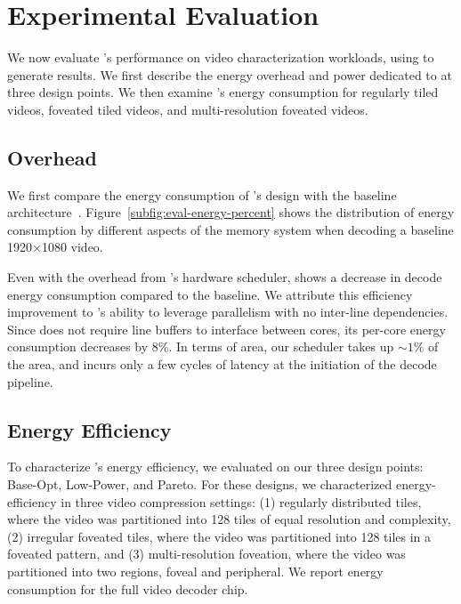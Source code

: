 
\section{Experimental Evaluation}

We now evaluate \nameArch's performance on video characterization workloads, using \nameArchprof to generate results.
We first describe the energy overhead and power dedicated to \nameArch at three design points.
We then examine \nameArch's energy consumption for regularly tiled videos, foveated tiled videos, and multi-resolution foveated videos.



\subsection{\nameArch Overhead}
We first compare the energy consumption of \nameArch's design with the baseline architecture~\cite{tikekar18ijssc}. Figure~\ref{subfig:eval-energy-percent} shows the distribution of energy consumption by different aspects of the memory system when decoding a baseline 1920$\times$1080 video.

\evalEnergyPower

Even with the overhead from \nameArch's hardware scheduler, \nameArch shows a decrease in decode energy consumption compared to the baseline. We attribute this efficiency improvement to \nameArch's ability to leverage parallelism with no inter-line dependencies.
Since \nameArch does not require line buffers to interface between cores, its per-core energy consumption decreases by 8\%.
In terms of area, our scheduler takes up $\sim1\%$ of the area, and incurs only a few cycles of latency at the initiation of the decode pipeline.

\subsection{Energy Efficiency}
To characterize \nameArch's energy efficiency, we evaluated on our three \nameArch design points: Base-Opt, Low-Power, and Pareto. For these designs, we characterized energy-efficiency in three video compression settings: (1) regularly distributed tiles, where the video was partitioned into 128 tiles of equal resolution and complexity, (2) irregular foveated tiles, where the video was partitioned into 128 tiles in a foveated pattern, and (3) multi-resolution foveation, where the video was partitioned into two regions, foveal and peripheral. We report energy consumption for the full video decoder chip.

